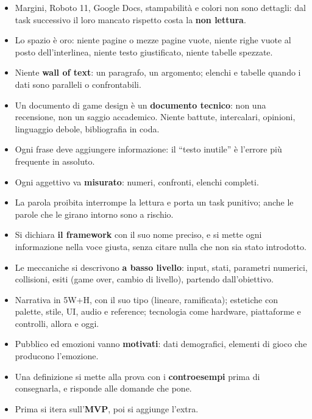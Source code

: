 \begin{itemize}
  \item Margini, Roboto 11, Google Docs, stampabilità e colori non sono
        dettagli: dal task successivo il loro mancato rispetto costa la
        \textbf{non lettura}.
  \item Lo spazio è oro: niente pagine o mezze pagine vuote, niente righe
        vuote al posto dell'interlinea, niente testo giustificato, niente
        tabelle spezzate.
  \item Niente \textbf{wall of text}: un paragrafo, un argomento; elenchi e
        tabelle quando i dati sono paralleli o confrontabili.
  \item Un documento di game design è un \textbf{documento tecnico}: non una
        recensione, non un saggio accademico. Niente battute, intercalari,
        opinioni, linguaggio debole, bibliografia in coda.
  \item Ogni frase deve aggiungere informazione: il ``testo inutile'' è
        l'errore più frequente in assoluto.
  \item Ogni aggettivo va \textbf{misurato}: numeri, confronti, elenchi
        completi.
  \item La parola proibita interrompe la lettura e porta un task punitivo;
        anche le parole che le girano intorno sono a rischio.
  \item Si dichiara \textbf{il framework} con il suo nome preciso, e si mette
        ogni informazione nella voce giusta, senza citare nulla che non sia
        stato introdotto.
  \item Le meccaniche si descrivono \textbf{a basso livello}: input, stati,
        parametri numerici, collisioni, esiti (game over, cambio di
        livello), partendo dall'obiettivo.
  \item Narrativa in 5W+H, con il suo tipo (lineare, ramificata); estetiche
        con palette, stile, UI, audio e reference; tecnologia come hardware,
        piattaforme e controlli, allora e oggi.
  \item Pubblico ed emozioni vanno \textbf{motivati}: dati demografici,
        elementi di gioco che producono l'emozione.
  \item Una definizione si mette alla prova con i \textbf{controesempi}
        prima di consegnarla, e risponde alle domande che pone.
  \item Prima si itera sull'\textbf{MVP}, poi si aggiunge l'extra.
\end{itemize}

